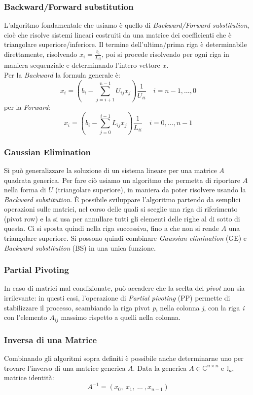\subsubsection{Backward/Forward substitution} \label{sec: Back-Forw Subst}
L'algoritmo fondamentale che usiamo è quello di \textit{Backward/Forward substitution}, cioè che risolve sistemi lineari costruiti da una matrice dei coefficienti che è triangolare superiore/inferiore. Il termine dell'ultima/prima riga è determinabile direttamente, risolvendo $x_i = \frac{b_i}{L_{ii}}$, poi si procede risolvendo per ogni riga in maniera sequenziale e determinando l'intero vettore $x$.\\Per la \textit{Backward} la formula generale è:
$$
x_i = \left( b_i - \sum_{j=i+1}^{n-1} U_{ij}x_j \right) \frac{1}{U_{ii}} \quad i = n-1, \dots , 0
$$
per la \textit{Forward}:
$$
x_i = \left( b_i - \sum_{j=0}^{i-1} L_{ij}x_j \right) \frac{1}{L_{ii}} \quad i = 0, \dots, n-1
$$

\subsubsection{Gaussian Elimination}
Si può generalizzare la soluzione di un sistema lineare per una matrice $A$ quadrata generica. Per fare ciò usiamo un algoritmo che permetta di riportare $A$ nella forma di $U$ (triangolare superiore), in maniera da poter risolvere usando la \textit{Backward substitution}. È possibile sviluppare l'algoritmo partendo da semplici operazioni sulle matrici, nel corso delle quali si sceglie una riga di riferimento (pivot row) e la si usa per annullare tutti gli elementi delle righe al di sotto di questa. Ci si sposta quindi nella riga successiva, fino a che non si rende $A$ una triangolare superiore. Si possono quindi combinare \textit{Gaussian elimination} (GE) e \textit{Backward substitution} (BS) in una unica funzione.

\subsubsection{Partial Pivoting}
In caso di matrici mal condizionate, può accadere che la scelta del \textit{pivot} non sia irrilevante: in questi casi, l'operazione di \textit{Partial pivoting} (PP) permette di stabilizzare il processo, scambiando la riga pivot \textit{p}, nella colonna \textit{j}, con la riga \textit{i} con l'elemento $A_{ij}$ massimo rispetto a quelli nella colonna.

\subsubsection{Inversa di una Matrice} \label{sec: inverse of a matrix}
Combinando gli algoritmi sopra definiti è possibile anche determinarne uno per trovare l'inverso di una matrice generica $A$. Data la generica $A\in \mathbb{C}^{n\times n}$ e $\mathbb{I}_n$, matrice identità:
$$
A^{-1} = (x_0,\ x_1,\ \dots\ , x_{n-1})
$$

